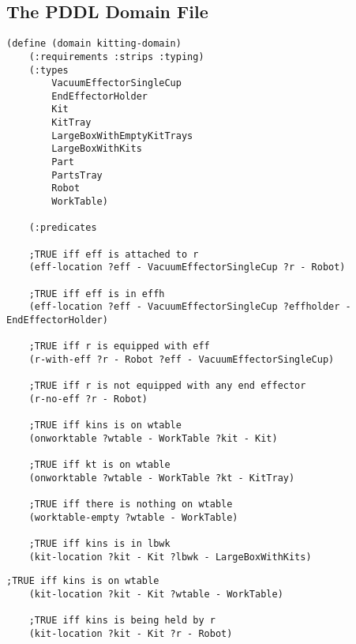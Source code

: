 \begin{appendices}

\section{The PDDL Domain File}\label{appendix:A}
\begin{minipage}{.5\paperwidth}
\begin{mylisting}
\begin{Verbatim}[commandchars=\\\{\},commandchars=+\[\],fontsize=\small,numbersep=3pt]
(define (domain kitting-domain)
	(:requirements :strips :typing)
	(:types
		VacuumEffectorSingleCup
		EndEffectorHolder
		Kit
		KitTray
		LargeBoxWithEmptyKitTrays
		LargeBoxWithKits
		Part
		PartsTray
		Robot
		WorkTable)

	(:predicates
	
	;TRUE iff eff is attached to r
	(eff-location ?eff - VacuumEffectorSingleCup ?r - Robot)	
		
	;TRUE iff eff is in effh		
	(eff-location ?eff - VacuumEffectorSingleCup ?effholder - EndEffectorHolder)

	;TRUE iff r is equipped with eff
	(r-with-eff ?r - Robot ?eff - VacuumEffectorSingleCup)				
		
	;TRUE iff r is not equipped with any end effector
	(r-no-eff ?r - Robot)						
		
	;TRUE iff kins is on wtable		
	(onworktable ?wtable - WorkTable ?kit - Kit)
		
	;TRUE iff kt is on wtable
	(onworktable ?wtable - WorkTable ?kt - KitTray)	
	
	;TRUE iff there is nothing on wtable
	(worktable-empty ?wtable - WorkTable)
	
	;TRUE iff kins is in lbwk
	(kit-location ?kit - Kit ?lbwk - LargeBoxWithKits)		

\end{Verbatim}
\end{mylisting}
\end{minipage}

\begin{minipage}{.5\paperwidth}
\begin{mylisting}
\begin{Verbatim}[commandchars=\\\{\},commandchars=+\[\],fontsize=\small,numbersep=3pt]
	;TRUE iff kins is on wtable
	(kit-location ?kit - Kit ?wtable - WorkTable)	
	
	;TRUE iff kins is being held by r
	(kit-location ?kit - Kit ?r - Robot)				
	

\end{Verbatim}
\end{mylisting}
\end{minipage}
\end{appendices}
